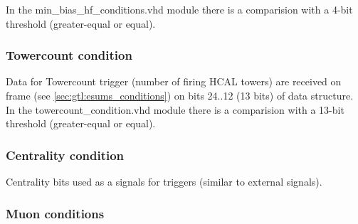 In the min\_bias\_hf\_conditions.vhd module there is a comparision with a 4-bit threshold (greater-equal or equal).

\subsubsection{Towercount condition}
\label{sec:gtl:towercount_cond}

Data for Towercount trigger (number of firing HCAL towers) are received on frame \htt (see \ref{sec:gtl:esums_conditions}) on bits 24..12 (13 bits) of \htt data structure. 
In the towercount\_condition.vhd module there is a comparision with a 13-bit threshold (greater-equal or equal).

\subsubsection{Centrality condition}
\label{sec:gtl:centrality_cond}

Centrality bits used as a signals for triggers (similar to external signals).

\subsubsection{Muon conditions}
\label{sec:gtl:muon_conditions}

